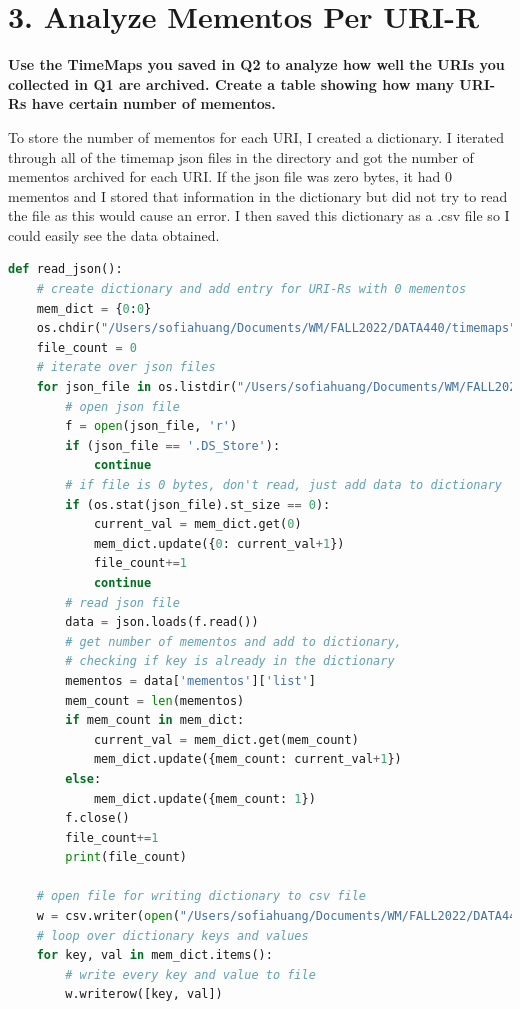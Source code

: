 \documentclass[12pt]{article}
\begin{document}
\section*{3. Analyze Mementos Per URI-R}

\noindent \textbf{Use the TimeMaps you saved in Q2 to analyze how well the URIs you collected in Q1 are archived. Create a table showing how many URI-Rs have certain number of mementos.}

To store the number of mementos for each URI, I created a dictionary. I iterated through all of the timemap json files in the directory and got the number of mementos archived for each URI. If the json file was zero bytes, it had 0 mementos and I stored that information in the dictionary but did not try to read the file as this would cause an error. I then saved this dictionary as a .csv file so I could easily see the data obtained.

\begin{lstlisting}[language=Python, caption=Find how many mementos obtained from each URI and save to CSV file, label=lst:copy]
def read_json():
    # create dictionary and add entry for URI-Rs with 0 mementos
    mem_dict = {0:0}
    os.chdir("/Users/sofiahuang/Documents/WM/FALL2022/DATA440/timemaps")
    file_count = 0
    # iterate over json files
    for json_file in os.listdir("/Users/sofiahuang/Documents/WM/FALL2022/DATA440/timemaps"):
        # open json file
        f = open(json_file, 'r')
        if (json_file == '.DS_Store'):
            continue
        # if file is 0 bytes, don't read, just add data to dictionary
        if (os.stat(json_file).st_size == 0):
            current_val = mem_dict.get(0)
            mem_dict.update({0: current_val+1})
            file_count+=1
            continue
        # read json file
        data = json.loads(f.read())
        # get number of mementos and add to dictionary, 
        # checking if key is already in the dictionary
        mementos = data['mementos']['list']
        mem_count = len(mementos)
        if mem_count in mem_dict:
            current_val = mem_dict.get(mem_count)
            mem_dict.update({mem_count: current_val+1})
        else:
            mem_dict.update({mem_count: 1})
        f.close()
        file_count+=1
        print(file_count)

    # open file for writing dictionary to csv file
    w = csv.writer(open("/Users/sofiahuang/Documents/WM/FALL2022/DATA440/memento_counts.csv", "w"))
    # loop over dictionary keys and values
    for key, val in mem_dict.items():
        # write every key and value to file
        w.writerow([key, val])

\end{lstlisting}
\end{document}
